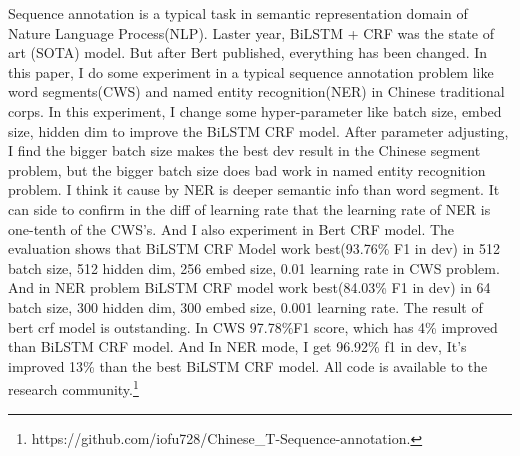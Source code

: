 Sequence annotation is a typical task in semantic representation domain of Nature Language Process(NLP).
Laster year, BiLSTM + CRF was the state of art (SOTA) model.
But after Bert published, everything has been changed.
In this paper, I do some experiment in a typical sequence annotation problem like word segments(CWS) and named entity recognition(NER) in Chinese traditional corps.
In this experiment, I change some hyper-parameter like batch size, embed size, hidden dim to improve the BiLSTM CRF model.
After parameter adjusting, I find the bigger batch size makes the best dev result in the Chinese segment problem, but the bigger batch size does bad work in named entity recognition problem.
I think it cause by NER is deeper semantic info than word segment.
It can side to confirm in the diff of learning rate that the learning rate of NER is one-tenth of the CWS's.
And I also experiment in Bert CRF model.
The evaluation shows that BiLSTM CRF Model work best(93.76\% F1 in dev) in 512 batch size, 512 hidden dim, 256 embed size, 0.01 learning rate in CWS problem.
And in NER problem BiLSTM CRF model work best(84.03\% F1 in dev) in 64 batch size, 300 hidden dim, 300 embed size, 0.001 learning rate. The result of bert crf model is outstanding.
In CWS 97.78\%F1 score, which has 4\% improved than BiLSTM CRF model.
And In NER mode, I get  96.92\% f1 in dev, It's improved 13\% than the best BiLSTM CRF model.
All code is available to the research community.\footnote{https://github.com/iofu728/Chinese_T-Sequence-annotation.}
